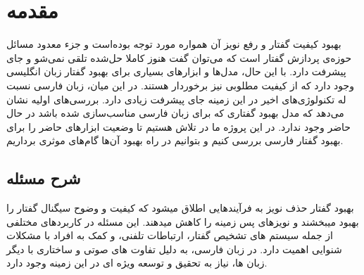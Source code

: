 \documentclass[fleqn]{report}
\begin{document}
\tableofcontents

\pagestyle{fancy}
\fancyhf{}


\chapter{مقدمه}
بهبود کیفیت گفتار و رفع نویز آن همواره مورد توجه بوده‌است و جزء معدود مسائل حوزه‌ی پردازش گفتار است که می‌توان گفت هنوز کاملا حل‌شده تلقی نمی‌شو و جای پیشرفت دارد.
با این حال، مدل‌ها و ابزار‌های بسیاری برای بهبود گفتار زبان انگلیسی وجود دارد که از کیفیت مطلوبی نیز برخوردار هستند.
در این میان، زبان فارسی نسبت له تکنولوژی‌های اخیر در این زمینه جای پیشرفت زیادی دارد.
بررسی‌های اولیه نشان می‌دهد که مدل بهبود گفتاری که برای زبان فارسی مناسب‌سازی شده باشد در حال حاضر وجود ندارد.
در این پروژه ما در تلاش هستیم تا وضعیت ابزار‌های حاضر را برای بهبود گفتار فارسی بررسی کنیم و بتوانیم در راه بهبود آن‌ها گام‌های موثری برداریم.

\section{شرح مسئله}
بهبود گفتار   حذف نویز  به  فرآیندهایی اطلاق میشود که کیفیت و وضوح سیگنال گفتار را بهبود میبخشند و نویزهای پس زمینه را کاهش میدهند. این مسئله در کاربردهای مختلفی از جمله سیستم های تشخیص گفتار، ارتباطات تلفنی، و کمک به افراد با مشکلات شنوایی اهمیت دارد. در زبان فارسی، به دلیل تفاوت های صوتی و ساختاری با دیگر زبان ها، نیاز به تحقیق و توسعه ویژه ای در این زمینه وجود دارد.
\end{document}
